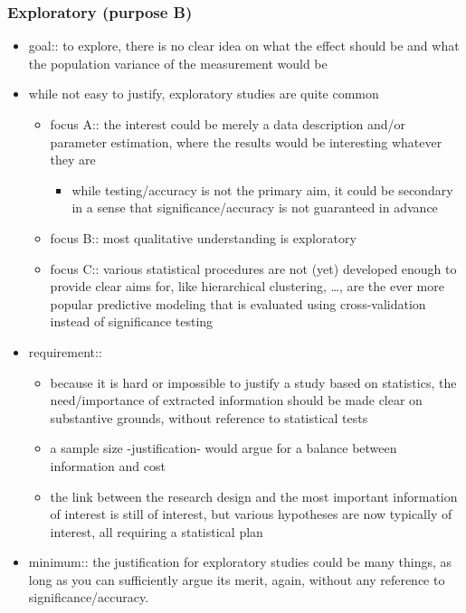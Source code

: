 \documentclass[]{article}
\providecommand{\tightlist}{%
  \setlength{\itemsep}{0pt}\setlength{\parskip}{0pt}}
\begin{document}
\subsubsection{Exploratory (purpose B)}\label{exploratory-purpose-b}

\begin{itemize}
\tightlist
\item
  goal:: to explore, there is no clear idea on what the effect should be
  and what the population variance of the measurement would be
\item
  while not easy to justify, exploratory studies are quite common

  \begin{itemize}
  \tightlist
  \item
    focus A:: the interest could be merely a data description and/or
    parameter estimation, where the results would be interesting
    whatever they are

    \begin{itemize}
    \tightlist
    \item
      while testing/accuracy is not the primary aim, it could be
      secondary in a sense that significance/accuracy is not guaranteed
      in advance
    \end{itemize}
  \item
    focus B:: most qualitative understanding is exploratory
  \item
    focus C:: various statistical procedures are not (yet) developed
    enough to provide clear aims for, like hierarchical clustering,
    \ldots{}, are the ever more popular predictive modeling that is
    evaluated using cross-validation instead of significance testing
  \end{itemize}
\item
  requirement::

  \begin{itemize}
  \tightlist
  \item
    because it is hard or impossible to justify a study based on
    statistics, the need/importance of extracted information should be
    made clear on substantive grounds, without reference to statistical
    tests
  \item
    a sample size -justification- would argue for a balance between
    information and cost
  \item
    the link between the research design and the most important
    information of interest is still of interest, but various hypotheses
    are now typically of interest, all requiring a statistical plan
  \end{itemize}
\item
  minimum:: the justification for exploratory studies could be many
  things, as long as you can sufficiently argue its merit, again,
  without any reference to significance/accuracy.
\end{itemize}
\end{document}
